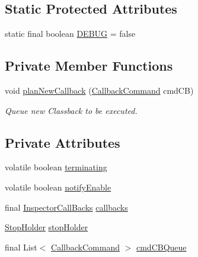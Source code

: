 \subsection*{Static Protected Attributes}
\begin{DoxyCompactItemize}
\item 
static final boolean \hyperlink{classgov_1_1nasa_1_1jpf_1_1inspector_1_1server_1_1callbacks_1_1_callbacks_sender_a10aff7ac289e87978a9bebd2ef3c87ae}{D\+E\+B\+UG} = false
\end{DoxyCompactItemize}
\subsection*{Private Member Functions}
\begin{DoxyCompactItemize}
\item 
void \hyperlink{classgov_1_1nasa_1_1jpf_1_1inspector_1_1server_1_1callbacks_1_1_callbacks_sender_ab4ea578bd6190b6e61b2445a79dab78a}{plan\+New\+Callback} (\hyperlink{interfacegov_1_1nasa_1_1jpf_1_1inspector_1_1server_1_1callbacks_1_1_callback_command}{Callback\+Command} cmd\+CB)
\begin{DoxyCompactList}\small\item\em Queue new Classback to be executed. \end{DoxyCompactList}\end{DoxyCompactItemize}
\subsection*{Private Attributes}
\begin{DoxyCompactItemize}
\item 
volatile boolean \hyperlink{classgov_1_1nasa_1_1jpf_1_1inspector_1_1server_1_1callbacks_1_1_callbacks_sender_a2cf0bafbdc759f89c0b54c36d437effa}{terminating}
\item 
volatile boolean \hyperlink{classgov_1_1nasa_1_1jpf_1_1inspector_1_1server_1_1callbacks_1_1_callbacks_sender_a1bc4581482a16f19da18a51194122acc}{notify\+Enable}
\item 
final \hyperlink{interfacegov_1_1nasa_1_1jpf_1_1inspector_1_1interfaces_1_1_inspector_call_backs}{Inspector\+Call\+Backs} \hyperlink{classgov_1_1nasa_1_1jpf_1_1inspector_1_1server_1_1callbacks_1_1_callbacks_sender_aacb11282361096d47169bc5010803c75}{callbacks}
\item 
\hyperlink{classgov_1_1nasa_1_1jpf_1_1inspector_1_1server_1_1jpf_1_1_stop_holder}{Stop\+Holder} \hyperlink{classgov_1_1nasa_1_1jpf_1_1inspector_1_1server_1_1callbacks_1_1_callbacks_sender_a3c4071a546588209852c336b484a378e}{stop\+Holder}
\item 
final List$<$ \hyperlink{interfacegov_1_1nasa_1_1jpf_1_1inspector_1_1server_1_1callbacks_1_1_callback_command}{Callback\+Command} $>$ \hyperlink{classgov_1_1nasa_1_1jpf_1_1inspector_1_1server_1_1callbacks_1_1_callbacks_sender_a1f3a8a41d1d0d1e0f992ad493f12e6e0}{cmd\+C\+B\+Queue}
\end{DoxyCompactItemize}


